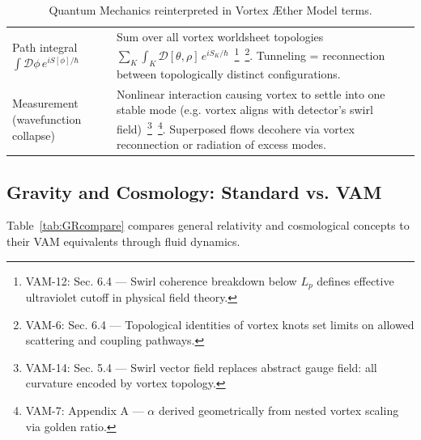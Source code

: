 \documentclass[a4paper,12pt]{article}
\begin{document}
\begin{table}[H]
\begin{tabular}{p{} | p{}}
            Path integral $\int \mathcal{D}\phi\,e^{iS[\phi]/\hbar}$ & Sum over all vortex worldsheet topologies $\sum_K \int_{K}\mathcal{D}[\theta,\rho]\,e^{iS_K/\hbar}$~\footnote{VAM-12: Sec. 6.4 — Swirl coherence breakdown below $L_p$ defines effective ultraviolet cutoff in physical field theory.}~\footnote{VAM-6: Sec. 6.4 — Topological identities of vortex knots set limits on allowed scattering and coupling pathways.}. Tunneling = reconnection between topologically distinct configurations. \\
            Measurement (wavefunction collapse) & Nonlinear interaction causing vortex to settle into one stable mode (e.g. vortex aligns with detector’s swirl field)~\footnote{VAM-14: Sec. 5.4 — Swirl vector field replaces abstract gauge field: all curvature encoded by vortex topology.}~\footnote{VAM-7: Appendix A — $\alpha$ derived geometrically from nested vortex scaling via golden ratio.}. Superposed flows decohere via vortex reconnection or radiation of excess modes. \\
            \hline
        \end{tabular}
        \caption{Quantum Mechanics reinterpreted in Vortex Æther Model terms.}
        \label{tab:QMcompare}
    \end{table}

    \newpage

    \subsection{Gravity and Cosmology: Standard vs. VAM}
    Table~\ref{tab:GRcompare} compares general relativity and cosmological concepts to their VAM equivalents through fluid dynamics.
\end{document}
